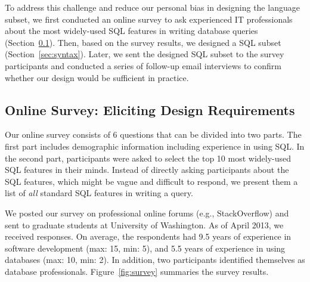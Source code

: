 To address this challenge and reduce our personal bias
in designing the language subset, we first conducted an online survey
to ask experienced IT professionals about the most widely-used
SQL features in writing database queries (Section~\ref{sec:survey}).
Then, based on the survey results, we designed
a SQL subset (Section~\ref{sec:syntax}).  
Later, we sent the designed SQL subset to the survey participants
and conducted a series of follow-up email interviews
to confirm whether our design would be sufficient in practice.









\vspace{-1mm}
\subsection{Online Survey: Eliciting Design Requirements}
\label{sec:survey}

\vspace{-1mm}

Our online survey consists of 6 questions that can be
divided into two parts. The first part includes
demographic information including experience in using SQL.
In the second part, participants were asked to select
the top 10 most widely-used SQL features in their minds.
Instead of directly asking participants about the SQL
features, which might be vague and difficult to respond,
we present them a list of \textit{all} standard
SQL features in writing a query.



We posted our survey on
professional online forums (e.g., StackOverflow)
and sent to graduate students at University of Washington.
As of April 2013, we received \respnum responses.
On average, the respondents had 9.5 years of experience
in software development (max: 15, min: 5),
and 5.5 years of experience in
using databases (max: 10, min: 2). In addition, two
participants identified themselves as database professionals.
Figure~\ref{fig:survey} summaries the survey results.


